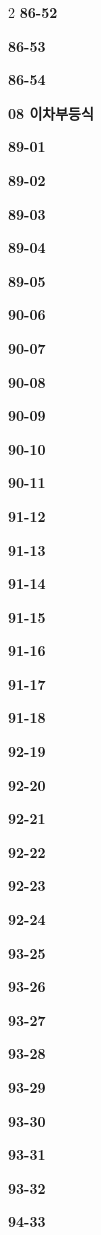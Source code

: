\documentclass[10pt,a4paper]{article}
\begin{document}
\begin{multicols}{2}
\noindent\textbf{86-52}\ \par
\noindent\textbf{86-53}\ \par
\noindent\textbf{86-54}\ \par
\noindent\textbf{08 이차부등식}\par\smallskip
\noindent\textbf{89-01}\ \par
\noindent\textbf{89-02}\ \par
\noindent\textbf{89-03}\ \par
\noindent\textbf{89-04}\ \par
\noindent\textbf{89-05}\ \par
\noindent\textbf{90-06}\ \par
\noindent\textbf{90-07}\ \par
\noindent\textbf{90-08}\ \par
\noindent\textbf{90-09}\ \par
\noindent\textbf{90-10}\ \par
\noindent\textbf{90-11}\ \par
\noindent\textbf{91-12}\ \par
\noindent\textbf{91-13}\ \par
\noindent\textbf{91-14}\ \par
\noindent\textbf{91-15}\ \par
\noindent\textbf{91-16}\ \par
\noindent\textbf{91-17}\ \par
\noindent\textbf{91-18}\ \par
\noindent\textbf{92-19}\ \par
\noindent\textbf{92-20}\ \par
\noindent\textbf{92-21}\ \par
\noindent\textbf{92-22}\ \par
\noindent\textbf{92-23}\ \par
\noindent\textbf{92-24}\ \par
\noindent\textbf{93-25}\ \par
\noindent\textbf{93-26}\ \par
\noindent\textbf{93-27}\ \par
\noindent\textbf{93-28}\ \par
\noindent\textbf{93-29}\ \par
\noindent\textbf{93-30}\ \par
\noindent\textbf{93-31}\ \par
\noindent\textbf{93-32}\ \par
\noindent\textbf{94-33}\ \par

\end{multicols}
\end{document}
